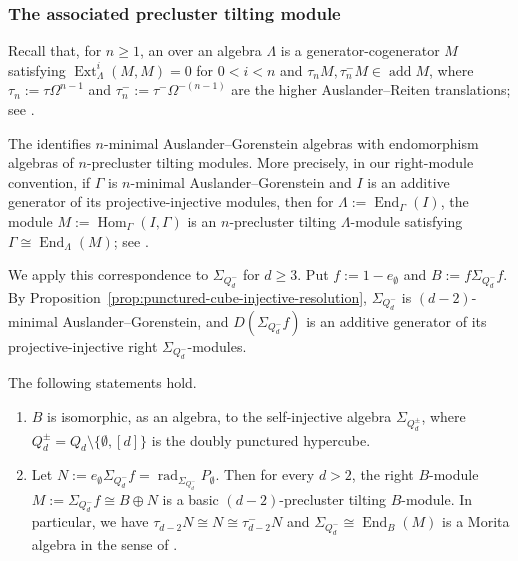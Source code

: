 \documentclass[a4paper,leqno]{amsart}
\begin{document}
\subsubsection{The associated precluster tilting module}\label{subsubsec:precluster}

Recall that, for $n\geq1$, an  over an algebra $\Lambda$ is a generator-cogenerator $M$ satisfying
$\operatorname{Ext}_{\Lambda}^i(M,M)=0$ for $0<i<n$ and
$\tau_nM,\tau_n^{-}M\in\operatorname{add}M$, where
$\tau_n:=\tau\Omega^{n-1}$ and
$\tau_n^{-}:=\tau^{-}\Omega^{-(n-1)}$ are the higher
Auslander--Reiten translations; see \cite[Definition~3.2]{IS18}.

The  identifies
$n$-minimal Auslander--Gorenstein algebras with endomorphism
algebras of $n$-precluster tilting modules. More precisely, in our
right-module convention, if $\Gamma$ is $n$-minimal
Auslander--Gorenstein and $I$ is an additive generator of its
projective-injective modules, then for
$\Lambda:=\operatorname{End}_{\Gamma}(I)$,
the module $M:=\operatorname{Hom}_{\Gamma}(I,\Gamma)$ is an $n$-precluster
tilting $\Lambda$-module satisfying
$\Gamma\cong\operatorname{End}_{\Lambda}(M)$; see
\cite[Proposition~4.4 and Theorem~4.5]{IS18}.

We apply this correspondence to $\Sigma_{Q_d^{-}}$ for $d\geq3$. Put
$f:=1-e_{\emptyset}$ and $B:=f\Sigma_{Q_d^{-}}f$. 
By Proposition~\ref{prop:punctured-cube-injective-resolution}, $\Sigma_{Q_d^{-}}$ is
$(d-2)$-minimal Auslander--Gorenstein, and $D(\Sigma_{Q_d^-}f)$ is an additive
generator of its projective-injective right $\Sigma_{Q_d^{-}}$-modules.

\begin{prop}\label{prop:punctured-cube-precluster}
The following statements hold.
\begin{enumerate}
    \item $B$ is isomorphic, as an algebra, to the self-injective algebra $\Sigma_{Q_d^{
\pm}}$, where $Q_d^{\pm}=Q_d\setminus\{\emptyset,[d]\}$ is the    doubly punctured hypercube. 

    \item Let $N:=e_{\emptyset}\Sigma_{Q_d^{-}}f=\operatorname{rad}_{\Sigma_{Q_d^{-}}} P_{\emptyset}$.
    Then for every $d>2$, the right $B$-module $M:=\Sigma_{Q_d^{-}}f\cong B\oplus N$ is a basic $(d-2)$-precluster
    tilting $B$-module.  In particular, we have $\tau_{d-2}N\cong N\cong\tau_{d-2}^{-}N$ and $\Sigma_{Q_d^{-}}\cong\operatorname{End}_B(M)$ is a Morita algebra in the sense of \cite{KY13}.  
\end{enumerate}
\end{prop}
\end{document}

